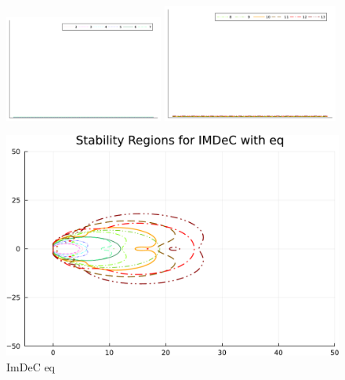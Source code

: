 \begin{figure}
	\centering
	\includegraphics[width=0.465\textwidth,trim={215 340 32 22}, clip]{pdf/odepics/colors_a-d_new_horiz_2-7_no_order.pdf}\!\!
	\includegraphics[width=0.515\textwidth,trim={178 340 30 22}, clip]{pdf/odepics/colors_a-d_new_horiz_8-13_no_order.pdf}\\
	\begin{minipage}[t]{0.32\textwidth}
		\centering
		\includegraphics[width=\textwidth, trim={0 0 0 22}, clip]{pdf/odepics/IMDeC_eq_ord13-crop.pdf}\\
		ImDeC eq
	\end{minipage}
	\begin{minipage}[t]{0.32\textwidth}
		\centering

\end{minipage}
\end{figure}
